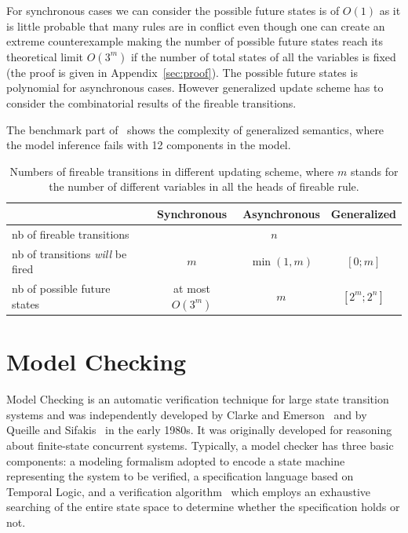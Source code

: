 For synchronous cases we can consider the possible future states is of $O(1)$ as it is little probable that many rules are in conflict even though one can create an extreme counterexample making the number of possible future states reach its theoretical limit $O(3^m)$ if the number of total states of all the variables is fixed (the proof is given in Appendix~\ref{sec:proof}).
The possible future states is polynomial for asynchronous cases.
However generalized update scheme has to consider the combinatorial results of the fireable transitions.

The benchmark part of~\cite{ribeiro2018learning} shows the complexity of generalized semantics, where the model inference fails with 12 components in the model. 

\begin{table}[ht]
    \centering
    \small
    \begin{tabular}{l|c|c|c}
        &Synchronous&Asynchronous&Generalized\\
        \hline
        nb of fireable transitions&\multicolumn{3}{c}{$n$}\\
        \hline
        nb of transitions \textit{will} be fired&$m$&$\min(1,m)$&$[0;m]$\\
        \hline
        nb of possible future states& at most $O(3^m)$&$m$&$[2^m;2^n]$
    \end{tabular}
    \caption[Update schemes]{Numbers of fireable transitions in different updating scheme, where $m$ stands for the number of different variables in all the heads of fireable rule.}
    \label{tab:semantics}
\end{table}

\section{Model Checking}\label{sec:modelchecking}
Model Checking is an automatic verification technique for large state transition systems and was independently developed by Clarke and Emerson~\cite{clarke1981design} and by Queille and Sifakis~\cite{queille1982specification} in the early 1980s. It was originally developed for reasoning about finite-state concurrent systems.
Typically, a model checker has three basic components: a modeling formalism adopted to encode a state machine representing the system to be verified, a specification language based on Temporal Logic, and a verification algorithm~\cite{clarke20142} which employs an exhaustive searching of the entire state space to determine whether the specification holds or not.

